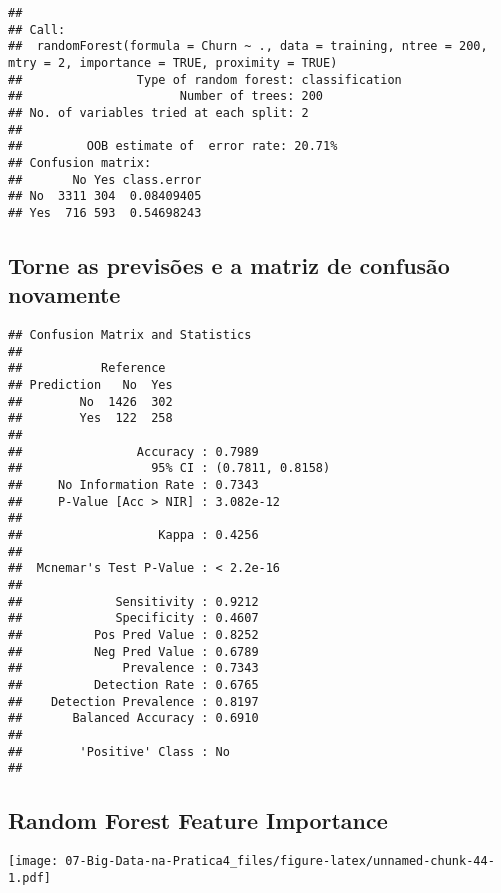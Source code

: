 \documentclass[]{article}
\begin{document}
\begin{verbatim}
## 
## Call:
##  randomForest(formula = Churn ~ ., data = training, ntree = 200,      mtry = 2, importance = TRUE, proximity = TRUE) 
##                Type of random forest: classification
##                      Number of trees: 200
## No. of variables tried at each split: 2
## 
##         OOB estimate of  error rate: 20.71%
## Confusion matrix:
##       No Yes class.error
## No  3311 304  0.08409405
## Yes  716 593  0.54698243
\end{verbatim}

\hypertarget{torne-as-previsuxf5es-e-a-matriz-de-confusuxe3o-novamente}{%
\subsection{Torne as previsões e a matriz de confusão
novamente}\label{torne-as-previsuxf5es-e-a-matriz-de-confusuxe3o-novamente}}

\begin{verbatim}
## Confusion Matrix and Statistics
## 
##           Reference
## Prediction   No  Yes
##        No  1426  302
##        Yes  122  258
##                                           
##                Accuracy : 0.7989          
##                  95% CI : (0.7811, 0.8158)
##     No Information Rate : 0.7343          
##     P-Value [Acc > NIR] : 3.082e-12       
##                                           
##                   Kappa : 0.4256          
##                                           
##  Mcnemar's Test P-Value : < 2.2e-16       
##                                           
##             Sensitivity : 0.9212          
##             Specificity : 0.4607          
##          Pos Pred Value : 0.8252          
##          Neg Pred Value : 0.6789          
##              Prevalence : 0.7343          
##          Detection Rate : 0.6765          
##    Detection Prevalence : 0.8197          
##       Balanced Accuracy : 0.6910          
##                                           
##        'Positive' Class : No              
## 
\end{verbatim}

\hypertarget{random-forest-feature-importance}{%
\subsection{Random Forest Feature
Importance}\label{random-forest-feature-importance}}

\texttt{[image: 07-Big-Data-na-Pratica4\_files/figure-latex/unnamed-chunk-44-1.pdf]}
\end{document}

